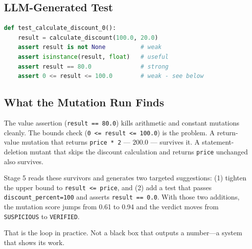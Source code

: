 \documentclass[conference]{IEEEtran}
\begin{document}
\subsection{LLM-Generated Test}

\begin{lstlisting}[language=Python]
def test_calculate_discount_0():
    result = calculate_discount(100.0, 20.0)
    assert result is not None          # weak
    assert isinstance(result, float)   # useful
    assert result == 80.0              # strong
    assert 0 <= result <= 100.0        # weak - see below
\end{lstlisting}

\subsection{What the Mutation Run Finds}

The value assertion (\texttt{result == 80.0}) kills arithmetic and constant mutations cleanly. The bounds check (\texttt{0 <= result <= 100.0}) is the problem. A return-value mutation that returns \texttt{price * 2} — $200.0$ — survives it. A statement-deletion mutant that skips the discount calculation and returns \texttt{price} unchanged also survives.

Stage 5 reads these survivors and generates two targeted suggestions: (1) tighten the upper bound to \texttt{result <= price}, and (2) add a test that passes \texttt{discount\_percent=100} and asserts \texttt{result == 0.0}. With those two additions, the mutation score jumps from 0.61 to 0.94 and the verdict moves from \texttt{SUSPICIOUS} to \texttt{VERIFIED}.

That is the loop in practice. Not a black box that outputs a number—a system that shows its work.
\end{document}
